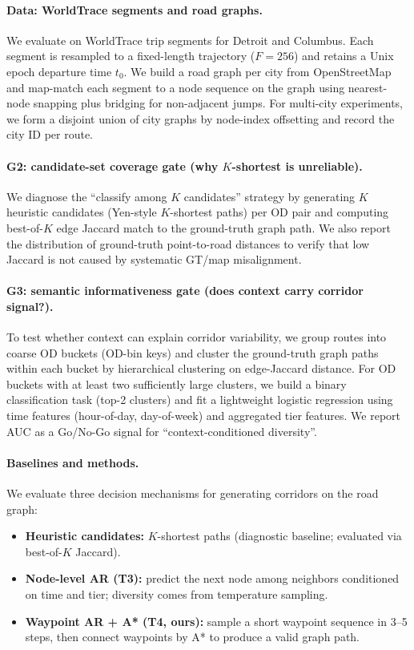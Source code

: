 \label{sec:experiments}

\paragraph{Data: WorldTrace segments and road graphs.}
We evaluate on WorldTrace trip segments for Detroit and Columbus.
Each segment is resampled to a fixed-length trajectory ($F=256$) and retains a Unix epoch departure time $t_0$.
We build a road graph per city from OpenStreetMap and map-match each segment to a node sequence on the graph using nearest-node snapping plus bridging for non-adjacent jumps.
For multi-city experiments, we form a disjoint union of city graphs by node-index offsetting and record the city ID per route.

\paragraph{G2: candidate-set coverage gate (why $K$-shortest is unreliable).}
We diagnose the ``classify among $K$ candidates'' strategy by generating $K$ heuristic candidates (Yen-style $K$-shortest paths) per OD pair and computing best-of-$K$ edge Jaccard match to the ground-truth graph path.
We also report the distribution of ground-truth point-to-road distances to verify that low Jaccard is not caused by systematic GT/map misalignment.

\paragraph{G3: semantic informativeness gate (does context carry corridor signal?).}
To test whether context can explain corridor variability, we group routes into coarse OD buckets (OD-bin keys) and cluster the ground-truth graph paths within each bucket by hierarchical clustering on edge-Jaccard distance.
For OD buckets with at least two sufficiently large clusters, we build a binary classification task (top-2 clusters) and fit a lightweight logistic regression using time features (hour-of-day, day-of-week) and aggregated tier features.
We report AUC as a Go/No-Go signal for ``context-conditioned diversity''.

\paragraph{Baselines and methods.}
We evaluate three decision mechanisms for generating corridors on the road graph:
\begin{itemize}
  \item \textbf{Heuristic candidates:} $K$-shortest paths (diagnostic baseline; evaluated via best-of-$K$ Jaccard).
  \item \textbf{Node-level AR (T3):} predict the next node among neighbors conditioned on time and tier; diversity comes from temperature sampling.
  \item \textbf{Waypoint AR + A* (T4, ours):} sample a short waypoint sequence in 3--5 steps, then connect waypoints by A* to produce a valid graph path.
\end{itemize}

